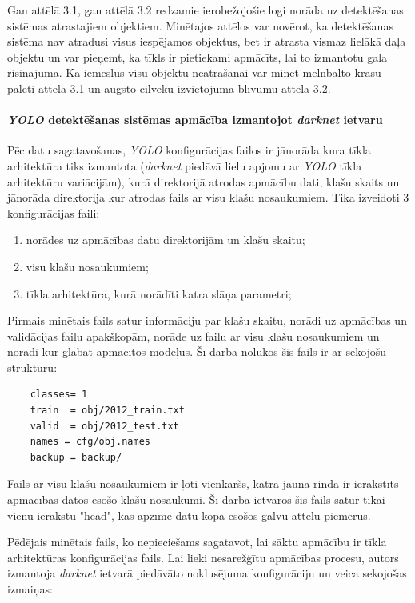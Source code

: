 Gan attēlā 3.1, gan attēlā 3.2 redzamie ierobežojošie logi norāda uz detektēšanas sistēmas atrastajiem objektiem. Minētajos attēlos var novērot, ka detektēšanas sistēma nav atradusi visus iespējamos objektus, bet ir atrasta vismaz lielākā daļa objektu un var pieņemt, ka tīkls ir pietiekami apmācīts, lai to izmantotu gala risinājumā. Kā iemeslus visu objektu neatrašanai var minēt melnbalto krāsu paleti attēlā 3.1 un augsto cilvēku izvietojuma blīvumu attēlā 3.2. 

\paragraph{\textit{YOLO} detektēšanas sistēmas apmācība izmantojot \textit{darknet} ietvaru}
\hfill\par
Pēc datu sagatavošanas, \textit{YOLO} konfigurācijas failos ir jānorāda kura tīkla arhitektūra tiks izmantota (\textit{darknet} piedāvā lielu apjomu ar \textit{YOLO} tīkla arhitektūru variācijām), kurā direktorijā atrodas apmācību dati, klašu skaits un jānorāda direktorija kur atrodas fails ar visu klašu nosaukumiem. Tika izveidoti 3 konfigurācijas faili: 
\begin{enumerate}
	\item norādes uz apmācības datu direktorijām un klašu skaitu; 
	\item visu klašu nosaukumiem;
	\item tīkla arhitektūra, kurā norādīti katra slāņa parametri;
\end{enumerate}

Pirmais minētais fails satur informāciju par klašu skaitu, norādi uz apmācības un validācijas failu apakškopām, norāde uz failu ar visu klašu nosaukumiem un norādi kur glabāt apmācītos modeļus. Šī darba nolūkos šis fails ir ar sekojošu struktūru: 
\begin{lstlisting} 
	classes= 1  
	train  = obj/2012_train.txt  
	valid  = obj/2012_test.txt  
	names = cfg/obj.names  
	backup = backup/
\end{lstlisting}

Fails ar visu klašu nosaukumiem ir ļoti vienkāršs, katrā jaunā rindā ir ierakstīts apmācības datos esošo klašu nosaukumi. Šī darba ietvaros šis fails satur tikai vienu ierakstu "head", kas apzīmē datu kopā esošos galvu attēlu piemērus.

Pēdējais minētais fails, ko nepieciešams sagatavot, lai sāktu apmācību ir tīkla arhitektūras konfigurācijas fails. Lai lieki nesarežģītu apmācības procesu, autors izmantoja \textit{darknet} ietvarā piedāvāto noklusējuma konfigurāciju un veica sekojošas izmaiņas:

